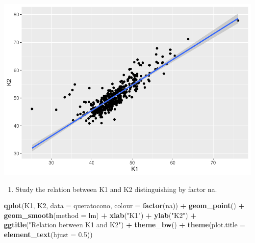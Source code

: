 \documentclass[
]{article}
\newenvironment{Shaded}{\begin{snugshade}}{\end{snugshade}}
\newcommand{\DataTypeTok}[1]{\textcolor[rgb]{0.13,0.29,0.53}{#1}}
\newcommand{\FloatTok}[1]{\textcolor[rgb]{0.00,0.00,0.81}{#1}}
\newcommand{\KeywordTok}[1]{\textcolor[rgb]{0.13,0.29,0.53}{\textbf{#1}}}
\newcommand{\NormalTok}[1]{#1}
\newcommand{\OperatorTok}[1]{\textcolor[rgb]{0.81,0.36,0.00}{\textbf{#1}}}
\newcommand{\StringTok}[1]{\textcolor[rgb]{0.31,0.60,0.02}{#1}}
\providecommand{\tightlist}{%
  \setlength{\itemsep}{0pt}\setlength{\parskip}{0pt}}
\begin{document}
\includegraphics{document_files/figure-latex/unnamed-chunk-3-2.pdf}

\begin{enumerate}
\def\labelenumi{\arabic{enumi}.}
\setcounter{enumi}{1}
\tightlist
\item
  Study the relation between K1 and K2 distinguishing by factor na.
\end{enumerate}

\begin{Shaded}
\begin{Highlighting}[]
\KeywordTok{qplot}\NormalTok{(K1, K2, }\DataTypeTok{data =}\NormalTok{ queratocono, }\DataTypeTok{colour =} \KeywordTok{factor}\NormalTok{(na)) }\OperatorTok{+}
\StringTok{  }\KeywordTok{geom_point}\NormalTok{() }\OperatorTok{+}
\StringTok{  }\KeywordTok{geom_smooth}\NormalTok{(}\DataTypeTok{method =}\NormalTok{ lm) }\OperatorTok{+}
\StringTok{  }\KeywordTok{xlab}\NormalTok{(}\StringTok{"K1"}\NormalTok{) }\OperatorTok{+}\StringTok{ }\KeywordTok{ylab}\NormalTok{(}\StringTok{"K2"}\NormalTok{) }\OperatorTok{+}
\StringTok{  }\KeywordTok{ggtitle}\NormalTok{(}\StringTok{"Relation between K1 and K2"}\NormalTok{) }\OperatorTok{+}
\StringTok{  }\KeywordTok{theme_bw}\NormalTok{() }\OperatorTok{+}
\StringTok{  }\KeywordTok{theme}\NormalTok{(}\DataTypeTok{plot.title =} \KeywordTok{element_text}\NormalTok{(}\DataTypeTok{hjust =} \FloatTok{0.5}\NormalTok{))}
\end{Highlighting}
\end{Shaded}
\end{document}
